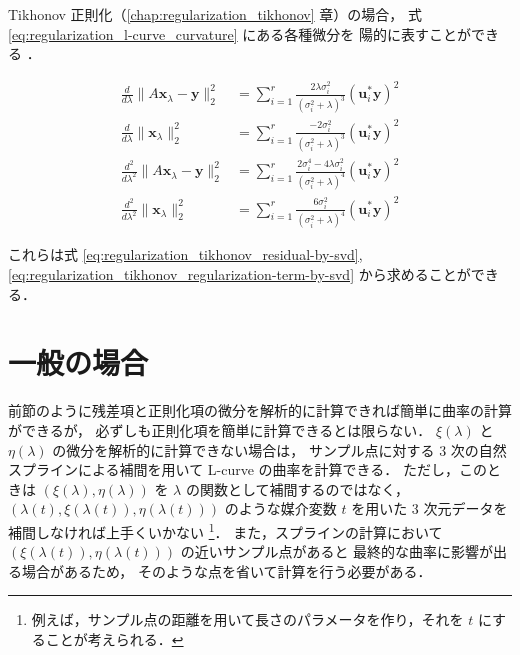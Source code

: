 Tikhonov 正則化（\ref{chap:regularization_tikhonov} 章）の場合，
式 \eqref{eq:regularization_l-curve_curvature} にある各種微分を
陽的に表すことができる
\cite{Hansen1992,Mueller2012}．

\begin{align}
    \frac{d}{d\lambda} \|A \bm{x}_\lambda - \bm{y}\|_2^2
     & = \sum_{i=1}^r \frac{2 \lambda \sigma_i^2}{(\sigma_i^2 + \lambda)^3}
    \left(\bm{u}_i^* \bm{y}\right)^2
    \\
    \frac{d}{d\lambda} \|\bm{x}_\lambda\|_2^2
     & = \sum_{i=1}^r \frac{-2 \sigma_i^2}{(\sigma_i^2 + \lambda)^3}
    \left(\bm{u}_i^* \bm{y}\right)^2
    \\
    \frac{d^2}{d\lambda^2} \|A \bm{x}_\lambda - \bm{y}\|_2^2
     & = \sum_{i=1}^r \frac{2 \sigma_i^4 - 4 \lambda \sigma_i^2}
    {(\sigma_i^2 + \lambda)^4}
    \left(\bm{u}_i^* \bm{y}\right)^2
    \\
    \frac{d^2}{d\lambda^2} \|\bm{x}_\lambda\|_2^2
     & = \sum_{i=1}^r \frac{6 \sigma_i^2}{(\sigma_i^2 + \lambda)^4}
    \left(\bm{u}_i^* \bm{y}\right)^2
\end{align}

これらは式
\eqref{eq:regularization_tikhonov_residual-by-svd},
\eqref{eq:regularization_tikhonov_regularization-term-by-svd}
から求めることができる．

\section{一般の場合}

前節のように残差項と正則化項の微分を解析的に計算できれば簡単に曲率の計算ができるが，
必ずしも正則化項を簡単に計算できるとは限らない．
$\xi(\lambda)$ と $\eta(\lambda)$
の微分を解析的に計算できない場合は，
サンプル点に対する 3 次の自然スプラインによる補間を用いて L-curve の曲率を計算できる．
ただし，このときは $(\xi(\lambda),\eta(\lambda))$ を
$\lambda$ の関数として補間するのではなく，
$(\lambda(t), \xi(\lambda(t)), \eta(\lambda(t)))$
のような媒介変数 $t$ を用いた
3 次元データを補間しなければ上手くいかない
\cite{Hansen1998,Hansen1993}
\footnote{例えば，サンプル点の距離を用いて長さのパラメータを作り，それを $t$ にすることが考えられる．}．
また，スプラインの計算において
$(\xi(\lambda(t)), \eta(\lambda(t)))$
の近いサンプル点があると
最終的な曲率に影響が出る場合があるため，
そのような点を省いて計算を行う必要がある．
